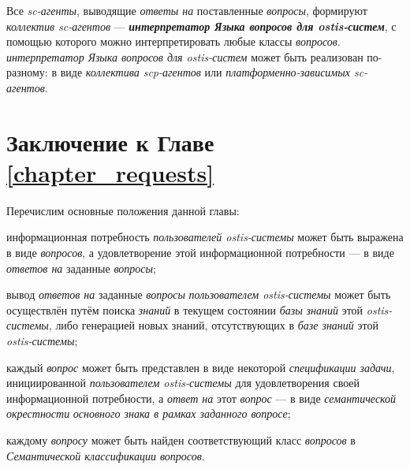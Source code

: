 Все \textit{sc-агенты}, выводящие \textit{ответы на} поставленные \textit{вопросы}, формируют \textit{коллектив sc-агентов} --- \textbf{\textit{интерпретатор Языка вопросов для ostis-систем}}, с помощью которого можно интерпретировать любые классы \textit{вопросов}. \textit{интерпретатор Языка вопросов для ostis-систем} может быть реализован по-разному: в виде \textit{коллектива scp-агентов} или \textit{платформенно-зависимых sc-агентов}.

\section*{Заключение к Главе \ref{chapter_requests}}

Перечислим основные положения данной главы:
\begin{textitemize}
	\item информационная потребность \textit{пользователей ostis-системы} может быть выражена в виде \textit{вопросов}, а удовлетворение этой информационной потребности --- в виде \textit{ответов на} заданные \textit{вопросы};
	\item вывод \textit{ответов на} заданные \textit{вопросы} \textit{пользователем ostis-системы} может быть осуществлён путём поиска \textit{знаний} в текущем состоянии \textit{базы знаний} этой \textit{ostis-системы}, либо генерацией новых знаний, отсутствующих в \textit{базе знаний} этой \textit{ostis-системы};
	\item каждый \textit{вопрос} может быть представлен в виде некоторой \textit{спецификации задачи}, инициированной \textit{пользователем ostis-системы} для удовлетворения своей информационной потребности, а \textit{ответ на} этот \textit{вопрос} --- в виде \textit{семантической окрестности} \textit{основного знака в рамках заданного вопросе};
	\item каждому \textit{вопросу} может быть найден соответствующий класс \textit{вопросов} в \textit{Семантической классификации вопросов}.
\end{textitemize}

%